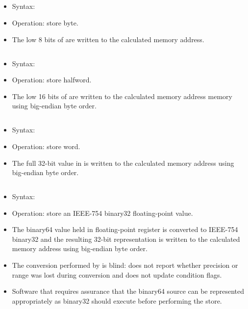 \subsection{}

\begin{itemize}
\item Syntax: 
\item Operation: store byte.
\item The low 8 bits of  are written to the calculated memory
      address.
\end{itemize}

\subsection{}

\begin{itemize}
\item Syntax: 
\item Operation: store halfword.
\item The low 16 bits of  are written to the calculated memory
      address memory using big-endian byte order.
\end{itemize}

\subsection{}

\begin{itemize}
\item Syntax: 
\item Operation: store word.
\item The full 32-bit value in  is written to the calculated memory
      address using big-endian byte order.
\end{itemize}

\subsection{}

\begin{itemize}
\item Syntax: 
\item Operation: store an IEEE-754 binary32 floating-point value.
\item The binary64 value held in floating-point register  is
      converted to IEEE-754 binary32 and the resulting 32-bit representation
      is written to the calculated memory address using big-endian byte order.
\item The conversion performed by  is blind:  does not
      report whether precision or range was lost during conversion and does not
      update condition flags.
\item Software that requires assurance that the binary64 source can be
      represented appropriately as binary32 should execute  before
      performing the store.
\end{itemize}

